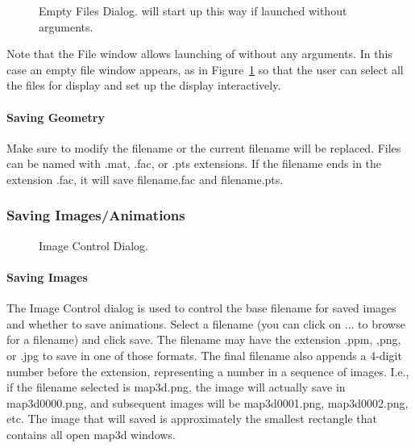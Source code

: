 

\begin{figure}[htb]
  \begin{makeimage}
  \end{makeimage}
  \filesdialogthree
  \caption{\label{fig:file3} Empty Files Dialog. \map{} will start up this way
            if launched without arguments.}
\end{figure}

Note that the File window allows launching of \map{} without any arguments.
In this case an empty file window appears, as in Figure~\ref{fig:file3} so
that the user can select all the files for display and set up the display
interactively.

\paragraph{Saving Geometry}
\label{sec:savegeom}


Make sure to modify the filename or the current filename will be replaced.  
Files can be named with .mat, .fac, or .pts extensions. If the filename ends
in the extension .fac, it will save filename.fac and filename.pts.

\subsubsection{Saving Images/Animations}
\label{sec:saving}

\begin{figure}[htb]
  \begin{makeimage}
  \end{makeimage}
  \savedialog
  \caption{\label{fig:save1} Image Control Dialog.}
\end{figure}


\paragraph{Saving Images}
\label{sec:saveimages}

The Image Control dialog is used to control the base filename for saved images
and whether to save animations.  Select a filename (you can click on ... to browse for
a filename) and click save. The filename may have the extension .ppm, ,png,
or .jpg to save in one of those formats.  The final filename also appends a
4-digit number before the extension, representing a number in a sequence of
images.  I.e., if the filename selected is map3d.png, the image will
actually save in map3d0000.png, and subsequent images will be
map3d0001.png, map3d0002.png, etc.  The image that will saved is
approximately the smallest rectangle that contains all open map3d windows.

